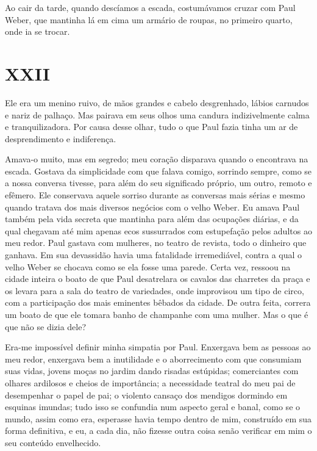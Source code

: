 Ao cair da tarde, quando descíamos a escada, costumávamos cruzar com Paul Weber, que mantinha lá em cima um armário de roupas, no primeiro quarto, onde ia se trocar.


\chapter*{\centering\Large{XXII}}

Ele era um menino ruivo, de mãos grandes e cabelo desgrenhado, lábios carnudos e nariz de palhaço. Mas pairava em seus olhos uma candura indizivelmente calma e tranquilizadora. Por causa desse olhar, tudo o que Paul fazia tinha um ar de desprendimento e indiferença.

Amava-o muito, mas em segredo; meu coração disparava quando o encontrava na escada. Gostava da simplicidade com que falava comigo, sorrindo sempre, como se a nossa conversa tivesse, para além do seu significado próprio, um outro, remoto e efêmero. Ele conservava aquele sorriso durante as conversas mais sérias e mesmo quando tratava dos mais diversos negócios com o velho Weber. Eu amava Paul também pela vida secreta que mantinha para além das ocupações diárias, e da qual chegavam até mim apenas ecos sussurrados com estupefação pelos adultos ao meu redor. Paul gastava com mulheres, no teatro de revista, todo o dinheiro que ganhava. Em sua devassidão havia uma fatalidade irremediável, contra a qual o velho Weber se chocava como se ela fosse uma parede. Certa vez, ressoou na cidade inteira o boato de que Paul desatrelara os cavalos das charretes da praça e os levara para a sala do teatro de variedades, onde improvisou um tipo de circo, com a participação dos mais eminentes bêbados da cidade. De outra feita, correra um boato de que ele tomara banho de champanhe com uma mulher. Mas o que é que não se dizia dele? 

Era-me impossível definir minha simpatia por Paul. Enxergava bem as pessoas ao meu redor, enxergava bem a inutilidade e o aborrecimento com que consumiam suas vidas, jovens moças no jardim dando risadas estúpidas; comerciantes com olhares ardilosos e cheios de importância; a necessidade teatral do meu pai de desempenhar o papel de pai; o violento cansaço dos mendigos dormindo em esquinas imundas; tudo isso se confundia num aspecto geral e banal, como se o mundo, assim como era, esperasse havia tempo dentro de mim, construído em sua forma definitiva, e eu, a cada dia, não fizesse outra coisa senão verificar em mim o seu conteúdo envelhecido.

